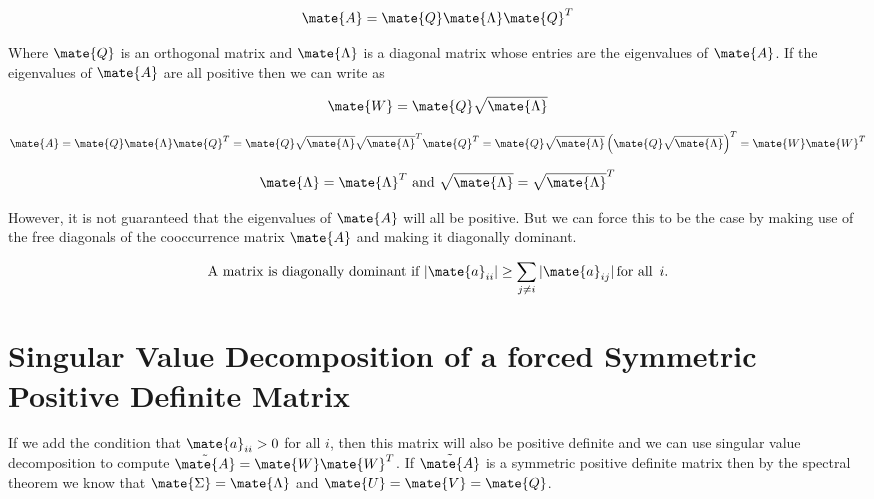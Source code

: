 \documentclass{article}
\begin{document}
\begin{equation*}
\mate{A} = \mate{Q}\mate{\Lambda}\mate{Q}^T
\end{equation*}

Where $\mate{Q}$ is an orthogonal matrix and $\mate{\Lambda}$ is a diagonal matrix whose entries are the eigenvalues of $\mate{A}$. If the eigenvalues of $\mate{A}$ are all positive then we can write as

\begin{equation*}
\mate{W} = \mate{Q} \sqrt{\mate{\Lambda}}
\end{equation*}

\begin{equation*}
\mate{A} = \mate{Q}\mate{\Lambda}\mate{Q}^T =  \mate{Q} \sqrt{\mate{\Lambda}} \sqrt{\mate{\Lambda}}^T \mate{Q}^T = \mate{Q} \sqrt{\mate{\Lambda}} \left( \mate{Q} \sqrt{\mate{\Lambda}} \right)^T = \mate{W}\mate{W}^T
\end{equation*}

\begin{equation*}
\text{$\mate{\Lambda} = \mate{\Lambda}^T$ and $\sqrt{\mate{\Lambda}} = \sqrt{\mate{\Lambda}}^T$}
\end{equation*}

However, it is not guaranteed that the eigenvalues of $\mate{A}$ will all be positive. But we can force this to be the case by making use of the free diagonals of the cooccurrence matrix $\mate{A}$ and making it diagonally dominant.

\begin{equation*}
\text{A matrix is diagonally dominant if }
\lvert \mate{a}_{ii} \rvert \geq \sum_{j \neq i}{\lvert \mate{a}_{ij} \rvert} \, \text{for all } \, i \text{.}
\end{equation*}


%
%

\section{Singular Value Decomposition of a forced Symmetric Positive Definite Matrix}

If we add the condition that $\mate{a}_{ii} > 0$ for all $i$, then this matrix will also be positive definite and we can use singular value decomposition to compute $\tilde{\mate{A}} = \mate{W}\mate{W}^T$. If $\tilde{\mate{A}}$ is a symmetric positive definite matrix then by the spectral theorem we know that $\mate{\Sigma} = \mate{\Lambda}$ and $\mate{U} = \mate{V} = \mate{Q}$.
\end{document}
